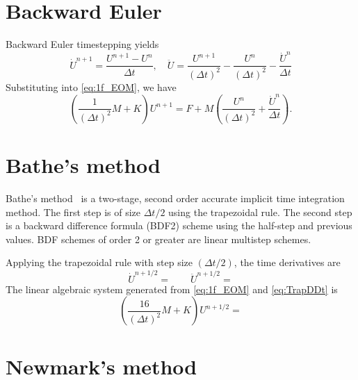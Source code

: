 \documentclass[12pt]{article}
\begin{document}
\section{Backward Euler}

Backward Euler timestepping yields
\begin{equation}
\dot{U}^{n+1} = \frac{U^{n+1} - U^n}{\Delta t}, 
\quad 
\ddot{U} = \frac{U^{n+1}}{(\Delta t)^2} - \frac{U^n}{(\Delta t)^2} - \frac{\dot{U}^n}{\Delta t}
\end{equation}
Substituting into \eqref{eq:1f_EOM}, we have
\begin{equation}
\left(\frac{1}{(\Delta t)^2} M + K \right) U^{n+1} = 
F + M \left( \frac{U^n}{(\Delta t)^2} + \frac{\dot{U}^n}{\Delta t} \right).
\end{equation}


\section{Bathe's method}

Bathe's method~\cite{Bathe2007} is a two-stage, second order accurate implicit time integration method.
The first step is of size $\Delta t/2$ using the trapezoidal rule.  The second step is a 
backward difference formula (BDF2) scheme using the half-step and previous values.  BDF
schemes of order 2 or greater are linear multistep schemes.

Applying the trapezoidal rule with step size $(\Delta t/2)$, the time derivatives are
\begin{equation}
\label{eq:TrapDDt}
\dot{U}^{n+1/2} = 
\qquad
\ddot{U}^{n+1/2} = 
\end{equation}
The linear algebraic system generated from \eqref{eq:1f_EOM} and \eqref{eq:TrapDDt}
is 
\begin{equation}
\left(\frac{16}{(\Delta t)^2} M + K \right) U^{n+1/2} = 
\end{equation}

\section{Newmark's method}


\end{document}
